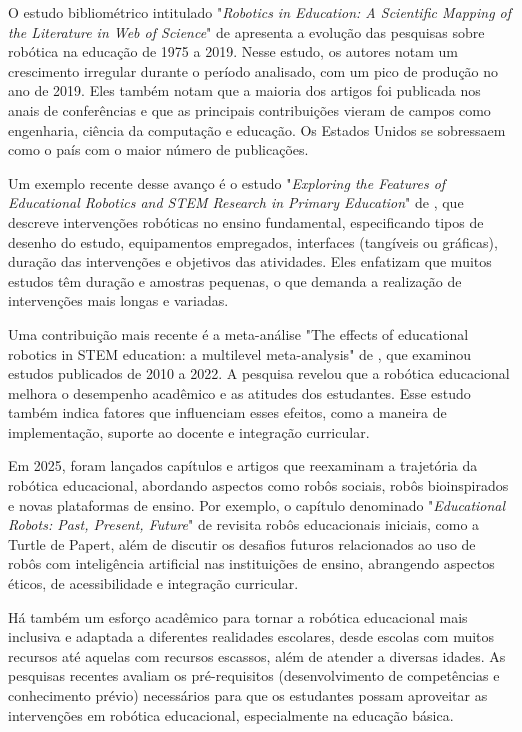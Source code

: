\documentclass[portuguese]{textolivre}
\begin{document}
O estudo bibliométrico intitulado "\textit{Robotics in Education: A Scientific Mapping of the Literature in Web of Science}" de \textcite{ref2} apresenta a evolução das pesquisas sobre robótica na educação de 1975 a 2019. Nesse estudo, os autores notam um crescimento irregular durante o período analisado, com um pico de produção no ano de 2019.   Eles também notam que a maioria dos artigos foi publicada nos anais de conferências e que as principais contribuições vieram de campos como engenharia, ciência da computação e educação. Os Estados Unidos se sobressaem como o país com o maior número de publicações. 

Um exemplo recente desse avanço é o estudo "\textit{Exploring the Features of Educational Robotics and STEM Research in Primary Education}" de \textcite{ref4}, que descreve intervenções robóticas no ensino fundamental, especificando tipos de desenho do estudo, equipamentos empregados, interfaces (tangíveis ou gráficas), duração das intervenções e objetivos das atividades. Eles enfatizam que muitos estudos têm duração e amostras pequenas, o que demanda a realização de intervenções mais longas e variadas.  

Uma contribuição mais recente é a meta-análise "The effects of educational robotics in STEM education: a multilevel meta-analysis" de \textcite{ref3}, que examinou estudos publicados de 2010 a 2022. A pesquisa revelou que a robótica educacional melhora o desempenho acadêmico e as atitudes dos estudantes. Esse estudo também indica fatores que influenciam esses efeitos, como a maneira de implementação, suporte ao docente e integração curricular. 

Em 2025, foram lançados capítulos e artigos que reexaminam a trajetória da robótica educacional, abordando aspectos como robôs sociais, robôs bioinspirados e novas plataformas de ensino. Por exemplo, o capítulo denominado "\textit{Educational Robots: Past, Present, Future}" de \textcite{ref1} revisita robôs educacionais iniciais, como a Turtle de Papert, além de discutir os desafios futuros relacionados ao uso de robôs com inteligência artificial nas instituições de ensino, abrangendo aspectos éticos, de acessibilidade e integração curricular. 

Há também um esforço acadêmico para tornar a robótica educacional mais inclusiva e adaptada a diferentes realidades escolares, desde escolas com muitos recursos até aquelas com recursos escassos, além de atender a diversas idades. As pesquisas recentes avaliam os pré-requisitos (desenvolvimento de competências e conhecimento prévio) necessários para que os estudantes possam aproveitar as intervenções em robótica educacional, especialmente na educação básica. 
\end{document}
